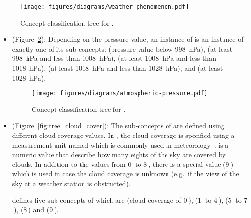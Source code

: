 \begin{figure}
  \centering
  \texttt{[image: figures/diagrams/weather-phenomenon.pdf]}
  \caption[Concept-classification tree for ]{Concept-classification tree for .}
  \label{fig:tree_weather_phenomenon}
\end{figure}

\begin{itemize}
  \item {} (Figure~\ref{fig:tree_atmospheric_pressure}): Depending on the pressure value, an instance of  is an instance of exactly one of its sub-concepts:  (pressure value below \SI{998}{\hecto\pascal}),  (at least \SI{998}{\hecto\pascal} and less than \SI{1008}{\hecto\pascal}),  (at least \SI{1008}{\hecto\pascal} and less than \SI{1018}{\hecto\pascal}),  (at least \SI{1018}{\hecto\pascal} and less than \SI{1028}{\hecto\pascal}), and  (at least \SI{1028}{\hecto\pascal}).
  
  \begin{figure}
    \centering
    \texttt{[image: figures/diagrams/atmospheric-pressure.pdf]}
    \caption[Concept-classification tree for ]{Concept-classification tree for .}
    \label{fig:tree_atmospheric_pressure}
  \end{figure}

  \item {} (Figure~\ref{fig:tree_cloud_cover}): The sub-concepts of  are defined using different cloud coverage values. In \smarthomeweather, the cloud coverage is specified using a measurement unit named  which is commonly used in meteorology~\cite{GlossaryOfMeteorology}.  is a numeric value that describe how many eights of the sky are covered by clouds. In addition to the values from \num{0}$\:$ to \num{8}$\:$, there is a special value (\num{9}$\:$) which is used in case the cloud coverage is unknown (e.g.\ if the view of the sky at a weather station is obstructed).
  
  \smarthomeweather defines five sub-concepts of  which are  (cloud coverage of \num{0}$\:$),  (\num{1}$\:$ to \num{4}$\:$),  (\num{5}$\:$ to \num{7}$\:$),  (\num{8}$\:$) and  (\num{9}$\:$).
  

\end{itemize}
